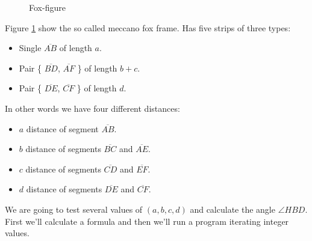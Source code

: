 \documentclass[11pt]{article}
\begin{document}
\begin{figure}[htb]
\caption{Fox-figure}
\label{fig:fox-face}
\end{figure}

Figure \ref{fig:fox-face} show the so called meccano fox frame.
Has five strips of three types:
\begin{itemize}
\item Single $\overline{AB}$ of length $a$.
\item Pair \{ $\overline{BD}$, $\overline{AF}$ \} of length $b+c$.
\item Pair \{ $\overline{DE}$, $\overline{CF}$ \} of length $d$.
\end{itemize}
In other words we have four different distances:
\begin{itemize}
\item $a$ distance of segment $\overline{AB}$.
\item $b$ distance of segments $\overline{BC}$ and $\overline{AE}$.
\item $c$ distance of segments $\overline{CD}$ and $\overline{EF}$.
\item $d$ distance of segments $\overline{DE}$ and $\overline{CF}$.
\end{itemize}
We are going to test several values of $(a,b,c,d)$ and calculate the angle $\angle{HBD}$.
First we'll calculate a formula and then we'll run a program iterating integer values.
\end{document}
